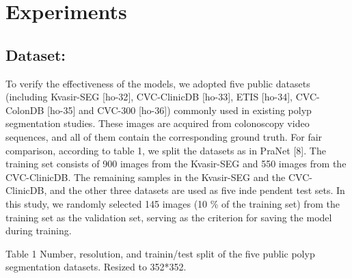 \section{Experiments}\label{experiments}

\subsection{\texorpdfstring{Dataset: }{Dataset: }}\label{dataset}

To verify the effectiveness of the models, we adopted five public
datasets (including Kvasir-SEG {[}ho-32{]}, CVC-ClinicDB {[}ho-33{]},
ETIS {[}ho-34{]}, CVC-ColonDB {[}ho-35{]} and CVC-300 {[}ho-36{]})
commonly used in existing polyp segmentation studies. These images are
acquired from colonoscopy video sequences, and all of them contain the
corresponding ground truth. \RL{}For fair comparison, according to table
1, we split the datasets as in PraNet {[}8{]}. The training set consists
of 900 images from the Kvasir-SEG and 550 images from the CVC-ClinicDB.
The remaining samples in the Kvasir-SEG and the CVC-ClinicDB, and the
other three datasets are used as five inde pendent test sets. In this
study, we randomly selected 145 images (10 \% of the training set) from
the training set as the validation set, serving as the criterion for
saving the model during training.

Table 1 Number, resolution, and trainin/test split of the five public
polyp segmentation datasets. Resized to 352*352.

